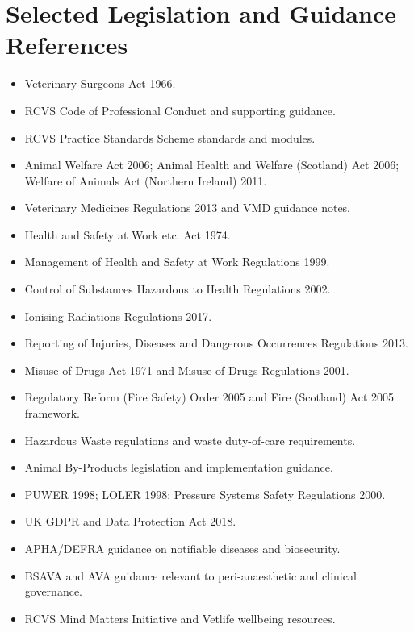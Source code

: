 \chapter{Selected Legislation and Guidance References}
\label{app:Selected Legislation and Guidance References}

\begin{itemize}
  \item Veterinary Surgeons Act 1966.
  \item RCVS Code of Professional Conduct and supporting guidance.
  \item RCVS Practice Standards Scheme standards and modules.
  \item Animal Welfare Act 2006; Animal Health and Welfare (Scotland) Act 2006; Welfare of Animals Act (Northern Ireland) 2011.
  \item Veterinary Medicines Regulations 2013 and VMD guidance notes.
  \item Health and Safety at Work etc. Act 1974.
  \item Management of Health and Safety at Work Regulations 1999.
  \item Control of Substances Hazardous to Health Regulations 2002.
  \item Ionising Radiations Regulations 2017.
  \item Reporting of Injuries, Diseases and Dangerous Occurrences Regulations 2013.
  \item Misuse of Drugs Act 1971 and Misuse of Drugs Regulations 2001.
  \item Regulatory Reform (Fire Safety) Order 2005 and Fire (Scotland) Act 2005 framework.
  \item Hazardous Waste regulations and waste duty-of-care requirements.
  \item Animal By-Products legislation and implementation guidance.
  \item PUWER 1998; LOLER 1998; Pressure Systems Safety Regulations 2000.
  \item UK GDPR and Data Protection Act 2018.
  \item APHA/DEFRA guidance on notifiable diseases and biosecurity.
  \item BSAVA and AVA guidance relevant to peri-anaesthetic and clinical governance.
  \item RCVS Mind Matters Initiative and Vetlife wellbeing resources.
\end{itemize}
